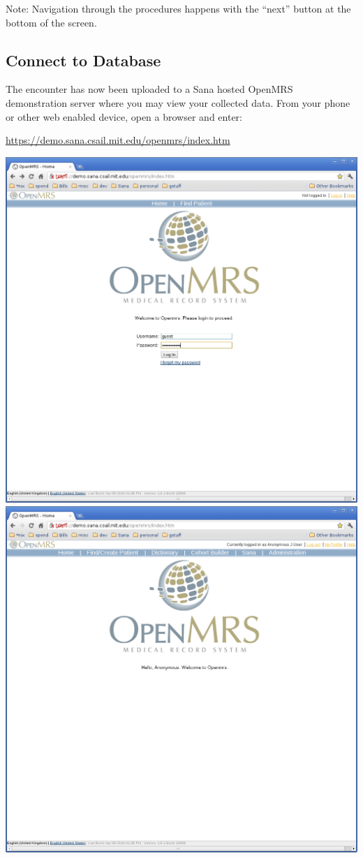 \documentclass[a4paper,10pt]{article}
\begin{document}
Note: Navigation through the procedures happens with the ``next'' button at the 
bottom of the screen.
\newpage

\subsection{Connect to Database}
The encounter has now been uploaded to a Sana hosted OpenMRS demonstration 
server where you may view your collected data. From your phone or other web 
enabled device, open a browser and enter:

\begin{center}
\url{https://demo.sana.csail.mit.edu/openmrs/index.htm}
\end{center}

\includegraphics[scale=0.25,keepaspectratio=true]{openmrs_login.png}
\includegraphics[scale=0.25,keepaspectratio=true]{openmrs_login_success_sana_tab.png}
\end{document}
